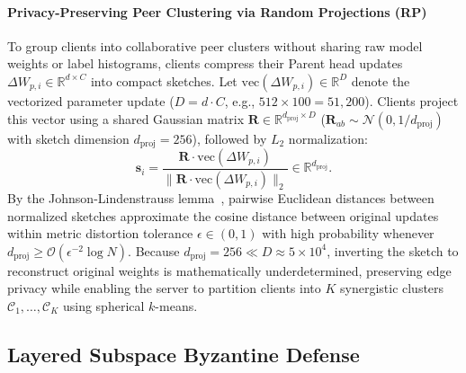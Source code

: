 \paragraph{Privacy-Preserving Peer Clustering via Random Projections (RP)}
To group clients into collaborative peer clusters without sharing raw model weights or label histograms, clients compress their Parent head updates $\Delta W_{p,i} \in \mathbb{R}^{d \times C}$ into compact sketches. Let $\mathrm{vec}(\Delta W_{p,i}) \in \mathbb{R}^D$ denote the vectorized parameter update ($D = d \cdot C$, e.g., $512 \times 100 = 51,200$). Clients project this vector using a shared Gaussian matrix $\mathbf{R} \in \mathbb{R}^{d_{\mathrm{proj}} \times D}$ ($\mathbf{R}_{ab} \sim \mathcal{N}(0, 1/d_{\mathrm{proj}})$ with sketch dimension $d_{\mathrm{proj}} = 256$), followed by $L_2$ normalization:
\begin{equation}
\label{eq:sketch}
\mathbf{s}_i = \frac{\mathbf{R} \cdot \mathrm{vec}(\Delta W_{p,i})}{\|\mathbf{R} \cdot \mathrm{vec}(\Delta W_{p,i})\|_2} \in \mathbb{R}^{d_{\mathrm{proj}}}.
\end{equation}
By the Johnson-Lindenstrauss lemma~\cite{johnson1984extensions,woodruff2014sketching}, pairwise Euclidean distances between normalized sketches approximate the cosine distance between original updates within metric distortion tolerance $\epsilon \in (0, 1)$ with high probability whenever $d_{\mathrm{proj}} \ge \mathcal{O}(\epsilon^{-2} \log N)$. Because $d_{\mathrm{proj}} = 256 \ll D \approx 5 \times 10^4$, inverting the sketch to reconstruct original weights is mathematically underdetermined, preserving edge privacy while enabling the server to partition clients into $K$ synergistic clusters $\mathcal{C}_1, \dots, \mathcal{C}_K$ using spherical $k$-means.

\subsection{Layered Subspace Byzantine Defense}
\label{sec:defense}

